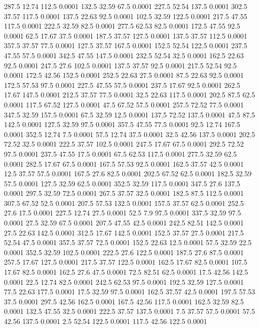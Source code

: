287.5	12.74	112.5	0.0001
132.5	32.59	67.5	0.0001
227.5	52.54	137.5	0.0001
302.5	37.57	117.5	0.0001
137.5	22.63	92.5	0.0001
102.5	32.59	122.5	0.0001
217.5	47.55	117.5	0.0001
222.5	32.59	82.5	0.0001
277.5	62.53	82.5	0.0001
172.5	47.55	92.5	0.0001
62.5	17.67	37.5	0.0001
187.5	37.57	127.5	0.0001
137.5	37.57	112.5	0.0001
357.5	37.57	77.5	0.0001
127.5	37.57	167.5	0.0001
152.5	52.54	122.5	0.0001
237.5	47.55	57.5	0.0001
342.5	47.55	147.5	0.0001
232.5	52.54	32.5	0.0001
162.5	22.63	92.5	0.0001
247.5	27.6	102.5	0.0001
137.5	37.57	92.5	0.0001
217.5	52.54	92.5	0.0001
172.5	42.56	152.5	0.0001
252.5	22.63	27.5	0.0001
87.5	22.63	92.5	0.0001
172.5	57.53	97.5	0.0001
227.5	47.55	57.5	0.0001
237.5	17.67	92.5	0.0001
262.5	17.67	147.5	0.0001
212.5	37.57	77.5	0.0001
32.5	22.63	117.5	0.0001
202.5	87.5	62.5	0.0001
117.5	67.52	127.5	0.0001
47.5	67.52	57.5	0.0001
257.5	72.52	77.5	0.0001
347.5	32.59	157.5	0.0001
67.5	32.59	12.5	0.0001
137.5	72.52	137.5	0.0001
47.5	87.5	142.5	0.0001
127.5	32.59	97.5	0.0001
357.5	47.55	77.5	0.0001
92.5	12.74	167.5	0.0001
352.5	12.74	7.5	0.0001
57.5	12.74	37.5	0.0001
32.5	42.56	137.5	0.0001
202.5	72.52	32.5	0.0001
222.5	37.57	102.5	0.0001
247.5	17.67	67.5	0.0001
292.5	72.52	97.5	0.0001
237.5	47.55	17.5	0.0001
67.5	62.53	117.5	0.0001
277.5	32.59	62.5	0.0001
282.5	17.67	67.5	0.0001
167.5	57.53	92.5	0.0001
162.5	37.57	42.5	0.0001
12.5	37.57	57.5	0.0001
167.5	27.6	82.5	0.0001
202.5	67.52	62.5	0.0001
182.5	32.59	57.5	0.0001
127.5	32.59	62.5	0.0001
352.5	32.59	117.5	0.0001
347.5	27.6	137.5	0.0001
297.5	32.59	72.5	0.0001
267.5	37.57	32.5	0.0001
182.5	87.5	112.5	0.0001
307.5	67.52	52.5	0.0001
207.5	57.53	132.5	0.0001
157.5	37.57	62.5	0.0001
252.5	27.6	17.5	0.0001
227.5	12.74	27.5	0.0001
52.5	7.9	97.5	0.0001
337.5	32.59	97.5	0.0001
27.5	32.59	67.5	0.0001
207.5	47.55	42.5	0.0001
242.5	82.51	142.5	0.0001
27.5	22.63	142.5	0.0001
312.5	17.67	142.5	0.0001
152.5	37.57	27.5	0.0001
217.5	52.54	47.5	0.0001
357.5	37.57	72.5	0.0001
152.5	22.63	12.5	0.0001
57.5	32.59	22.5	0.0001
352.5	32.59	102.5	0.0001
222.5	27.6	122.5	0.0001
187.5	27.6	87.5	0.0001
257.5	17.67	127.5	0.0001
217.5	37.57	122.5	0.0001
162.5	17.67	82.5	0.0001
107.5	17.67	82.5	0.0001
162.5	27.6	47.5	0.0001
72.5	82.51	62.5	0.0001
17.5	42.56	142.5	0.0001
22.5	12.74	82.5	0.0001
242.5	62.53	97.5	0.0001
192.5	32.59	127.5	0.0001
77.5	22.63	177.5	0.0001
17.5	32.59	97.5	0.0001
162.5	37.57	42.5	0.0001
197.5	57.53	37.5	0.0001
297.5	42.56	162.5	0.0001
167.5	42.56	117.5	0.0001
162.5	32.59	82.5	0.0001
132.5	47.55	32.5	0.0001
222.5	37.57	137.5	0.0001
7.5	37.57	57.5	0.0001
57.5	42.56	137.5	0.0001
2.5	52.54	122.5	0.0001
117.5	42.56	122.5	0.0001
